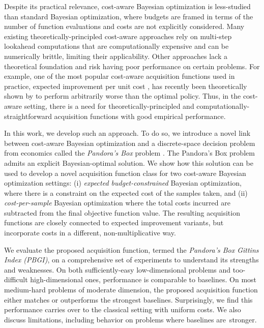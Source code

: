 \documentclass{article}
\begin{document}
Despite its practical relevance, cost-aware Bayesian optimization is less-studied than standard Bayesian optimization, where budgets are framed in terms of the number of function evaluations and costs are not explicitly considered. 
Many existing theoretically-principled cost-aware approaches \cite{yue2020non,jiang2020efficient,lee2021nonmyopic,astudillo2021multi,belakaria2023bayesian} rely on multi-step lookahead computations that are computationally expensive and can be numerically brittle, limiting their applicability.
Other approaches lack a theoretical foundation and risk having poor performance on certain problems. 
For example, one of the most popular cost-aware acquisition functions used in practice, expected improvement per unit cost \cite{snoek2012practical}, has recently been theoretically shown by \textcite{astudillo2021multi} to perform arbitrarily worse than the optimal policy.
Thus, in the cost-aware setting, there is a need for theoretically-principled and computationally-straightforward acquisition functions with good empirical performance.

In this work, we develop such an approach.
To do so, we introduce a novel link between cost-aware Bayesian optimization and a discrete-space decision problem from economics called the \emph{Pandora's Box} problem \cite{weitzman1979optimal,doval_whether_2018, singla_price_2018}.
The Pandora's Box problem admits an explicit Bayesian-optimal solution.
We show how this solution can be used to develop a novel acquisition function class for two cost-aware Bayesian optimization settings: (i) \emph{expected budget-constrained} Bayesian optimization, where there is a constraint on the expected cost of the samples taken, and (ii) \emph{cost-per-sample} Bayesian optimization where the total costs incurred are subtracted from the final objective function value.
The resulting acquisition functions are closely connected to expected improvement variants, but incorporate costs in a different, non-multiplicative way.

We evaluate the proposed acquisition function, termed the \emph{Pandora's Box Gittins Index (PBGI)}, on a comprehensive set of experiments to understand its strengths and weaknesses.
On both sufficiently-easy low-dimensional problems and too-difficult high-dimensional ones, performance is comparable to baselines.
On most medium-hard problems of moderate dimension, the proposed acquisition function either matches or outperforms the strongest baselines.
Surprisingly, we find this performance carries over to the classical setting with uniform costs.
We also discuss limitations, including behavior on problems where baselines are~stronger.
\end{document}
